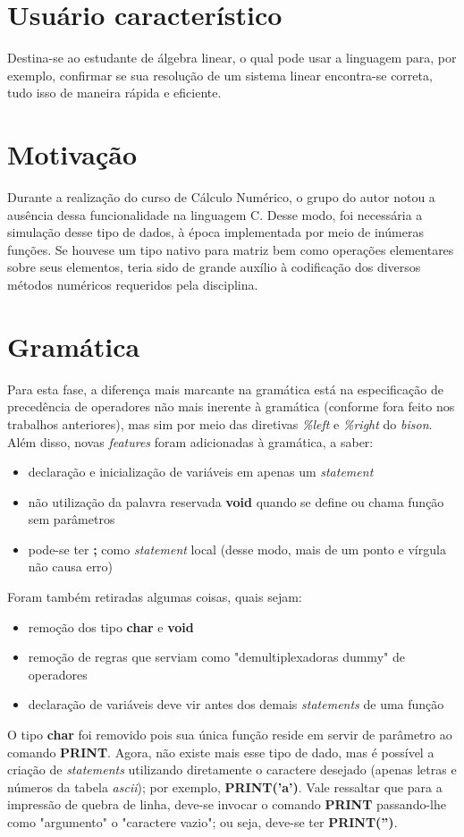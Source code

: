 \documentclass[
	article,			%
	11pt,				%
	oneside,			%
	a4paper,			%
	english,			%
	brazil,				%
	sumario=tradicional
	]{abntex2}
\renewcommand{\it}[1]{\textit{#1}}
\renewcommand{\bf}[1]{\textbf{#1}}
\begin{document}
\section{Usuário característico}
Destina-se ao estudante de álgebra linear, o qual pode usar a linguagem para, por exemplo, confirmar se sua resolução de um sistema linear encontra-se correta, tudo isso de maneira rápida e eficiente.

\section{Motivação}
Durante a realização do curso de Cálculo Numérico, o grupo do autor notou a ausência dessa funcionalidade na linguagem C. Desse modo, foi necessária a simulação desse tipo de dados, à época implementada por meio de inúmeras funções. Se houvese um tipo nativo para matriz bem como operações elementares sobre seus elementos, teria sido de grande auxílio à codificação dos diversos métodos numéricos requeridos pela disciplina.
\par


\section{Gramática}

Para esta fase, a diferença mais marcante na gramática está na especificação de precedência de operadores não mais inerente à gramática (conforme fora feito nos trabalhos anteriores), mas sim por meio das diretivas \it{\%left} e \it{\%right} do \it{bison}. Além disso, novas \it{features} foram adicionadas à gramática, a saber:
\begin{itemize}
	\item declaração e inicialização de variáveis em apenas um \it{statement}
	\item não utilização da palavra reservada \bf{void} quando se define ou chama função sem parâmetros
	\item pode-se ter \bf{;} como \it{statement} local (desse modo, mais de um ponto e vírgula não causa erro)	
\end{itemize}
Foram também retiradas algumas coisas, quais sejam:
\begin{itemize}
	\item remoção dos tipo \bf{char} e \bf{void}
	\item remoção de regras que serviam como "demultiplexadoras dummy"  de operadores
	\item declaração de variáveis deve vir antes dos demais \it{statements} de uma função
\end{itemize}
O tipo \bf{char} foi removido pois sua única função reside em servir de parâmetro ao comando \bf{PRINT}. Agora, não existe mais esse tipo de dado, mas é possível a criação de \it{statements} utilizando diretamente o caractere desejado (apenas letras e números da tabela \it{ascii}); por exemplo, \bf{PRINT('a')}. Vale ressaltar que para a impressão de quebra de linha, deve-se invocar o comando \bf{PRINT} passando-lhe como "argumento"  o "caractere vazio"; ou seja, deve-se 
ter \bf{PRINT('')}.
\end{document}
